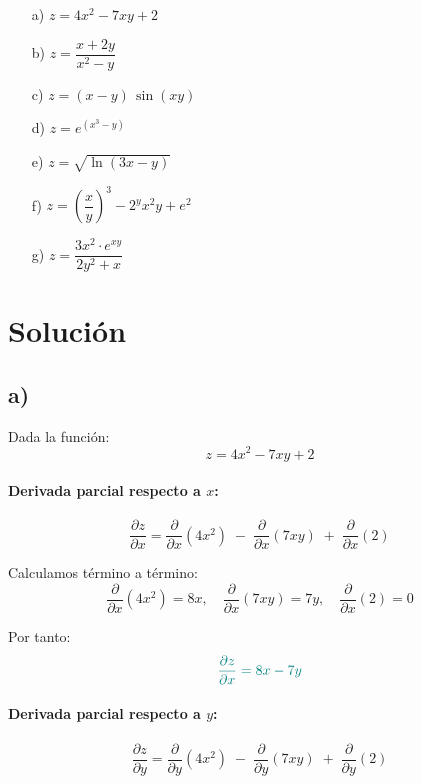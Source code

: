 \documentclass{article}
\begin{document}
\begin{enumerate}
    \item[a)] \( z = 4x^2 - 7xy + 2 \)
    
    \item[b)] \( z = \dfrac{x + 2y}{x^2 - y} \)
    
    \item[c)] \( z = (x - y)\,\sin(xy) \)
    
    \item[d)] \( z = e^{(x^3 - y)} \)
    
    \item[e)] \( z = \sqrt{\ln(3x - y)} \)
    
    \item[f)] \( z = \left(\dfrac{x}{y}\right)^3 - 2^yx^2 y + e^2 \)
    
    \item[g)] \( z = \dfrac{3x^2 \cdot e^{xy}}{2y^2 + x} \)
\end{enumerate}


\newpage
\section*{Solución}
\subsection*{a)}
Dada la función:
\[
z = 4x^2 - 7xy + 2
\]

\paragraph{Derivada parcial respecto a \(x\):}
\[
\frac{\partial z}{\partial x}
= \frac{\partial}{\partial x}(4x^2)
  \;-\; \frac{\partial}{\partial x}(7xy)
  \;+\; \frac{\partial}{\partial x}(2)
\]

Calculamos término a término:
\[
\frac{\partial}{\partial x}(4x^2) = 8x,
\quad
\frac{\partial}{\partial x}(7xy) = 7y,
\quad
\frac{\partial}{\partial x}(2) = 0
\]

Por tanto:
\[
\color{teal}
\frac{\partial z}{\partial x}
= 8x - 7y
\]

\paragraph{Derivada parcial respecto a \(y\):}
\[
\frac{\partial z}{\partial y}
= \frac{\partial}{\partial y}(4x^2)
  \;-\; \frac{\partial}{\partial y}(7xy)
  \;+\; \frac{\partial}{\partial y}(2)
\]
\end{document}
